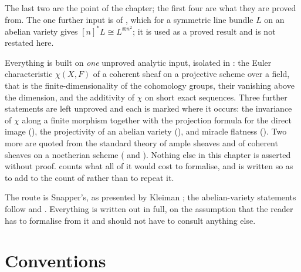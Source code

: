 The last two are the point of the chapter; the first four are what they are
proved from.  The one further input is
 of , which for a symmetric line
bundle $L$ on an abelian variety gives $[n]^*L\cong L^{\otimes n^2}$; it is
used as a proved result and is not restated here.

Everything is built on \emph{one} unproved analytic input, isolated in
: the Euler characteristic $\chi(X,F)$ of a coherent sheaf
on a projective scheme over a field, that is the finite-dimensionality of the
cohomology groups, their vanishing above the dimension, and the additivity of
$\chi$ on short exact sequences.  Three further statements are left unproved
and each is marked where it occurs: the invariance of $\chi$ along a finite
morphism together with the projection formula for the direct image
(), the projectivity of an abelian variety
(), and miracle flatness
().  Two more are quoted from the standard
theory of ample sheaves and of coherent sheaves on a noetherian scheme
( and ).  Nothing else in
this chapter is asserted without proof.   counts what all of
it would cost to formalise, and is written so as to add to the count of
 rather than to repeat it.

The route is Snapper's, as presented by Kleiman
\cite[\S1]{KleimanAmpleness}; the abelian-variety statements follow
\cite[\S6]{MumfordAbelianVarieties} and \cite[I, \S7]{MilneAbelianVarieties}.
Everything is written out in full, on the assumption that the reader has to
formalise from it and should not have to consult anything else.


\section{Conventions}\label{sec:deg-conventions}

